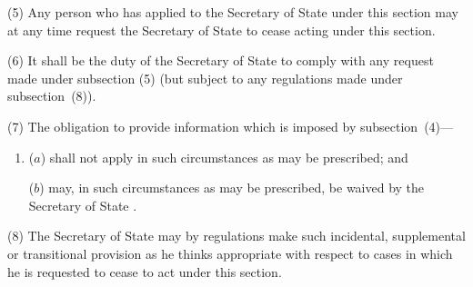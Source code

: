 \documentclass[12pt,a4paper]{article}
\begin{document}
(5) Any person who has applied to the 
Secretary of State  %
under this section may at any time request 
the Secretary of State  %
to cease acting under this section.

(6) It shall be the duty of the 
Secretary of State  %
to comply with any request made under subsection (5)  (but subject to any regulations made under subsection~(8)).

(7) The obligation to provide information which is imposed by subsection~(4)—
\begin{enumerate}\item[]
($a$) shall not apply in such circumstances as may be prescribed; and

($b$) may, in such circumstances as may be prescribed, be waived by the 
Secretary of State%
.
\end{enumerate}

(8) The Secretary of State may by regulations make such incidental, supplemental or transitional provision as he thinks appropriate with respect to cases in which he is requested to cease to act under this section.

%
\end{document}
